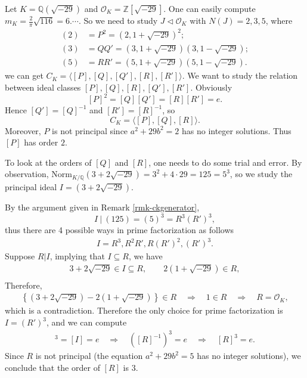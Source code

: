 \begin{example}
    Let \(K = \mathbb{Q}(\sqrt{-29})\) and \(\mathcal{O}_K = \mathbb{Z}[\sqrt{-29}]\). One can easily compute \(m_K = \frac{2}{\pi} \sqrt{116} = 6. \cdots\). So we need to study \(J \triangleleft \mathcal{O}_K\) with \(N(J) = 2,3,5\), where
    \begin{align*}
        (2) &=  P^2 = (2,1+\sqrt{-29})^2;\\
        (3) &= Q Q' = (3, 1+\sqrt{-29})(3,1-\sqrt{-29});\\
        (5) &= R R' = (5, 1+\sqrt{-29})(5, 1-\sqrt{-29}).
    \end{align*}
    we can get \(C_K = \langle [P], [Q], [Q'], [R], [R']\rangle\). We want to study the relation between ideal classes \([P],[Q],[R], [Q'],[R']\). Obviously
    \[
        [P]^2=[Q][Q']=[R][R']=e.
    \]
    Hence $[Q']=[Q]^{-1}$ and $[R']=[R]^{-1}$, so
    \[
        C_K=\langle [P],[Q],[R]\rangle.
    \]
    Moreover, $P$ is not principal since $a^2+29b^2=2$ has no integer solutions. Thus $[P]$ has order $2$.
    
    To look at the orders of $[Q]$ and $[R]$, one needs to do some trial and error. By observation, $\mathrm{Norm}_{K/\mathbb{Q}}(3+2\sqrt{-29}) = 3^2 + 4\cdot 29 = 125 = 5^3$, so we study the principal ideal
    \(I = (3+2 \sqrt{-29})\). 

    By the argument given in Remark \ref{rmk-ckgenerator}, 
    $$I\ |\ (125) = (5)^3 = R^3(R')^3,$$
    thus there are 4 possible ways in prime factorization as follows
    \begin{align*}
        I = R^3, R^2 R' , R (R')^2 , (R')^3.
    \end{align*}
    Suppose \(R|I\), implying that \(I \subseteq R\), we have
    \begin{align*}
        3+2\sqrt{-29} \in I \subseteq R,\quad \quad 2 (1+\sqrt{-29}) \in R,\\ 
    \end{align*}
    Therefore, 
    \begin{align*}
        \left\{(3+2\sqrt{-29}) - 2(1+\sqrt{-29}) \right\} \in R\quad 
        \Rightarrow \quad 1\in R\quad
        \Rightarrow \quad R= \mathcal{O}_K,
    \end{align*}
    which is a contradiction. Therefore the only choice for prime factorization is \(I = (R')^3\), and we can compute
\begin{align*}
    [R']^3 = [I] =e \quad 
    \Rightarrow\quad  \left([R]^{-1}\right)^3 = e\quad
    \Rightarrow \quad [R]^3 = e.
\end{align*}
Since $R$ is not principal (the equation $a^2+29b^2=5$ has no integer solutions), we conclude that the order of \([R]\) is \(3\). 


\end{example}
